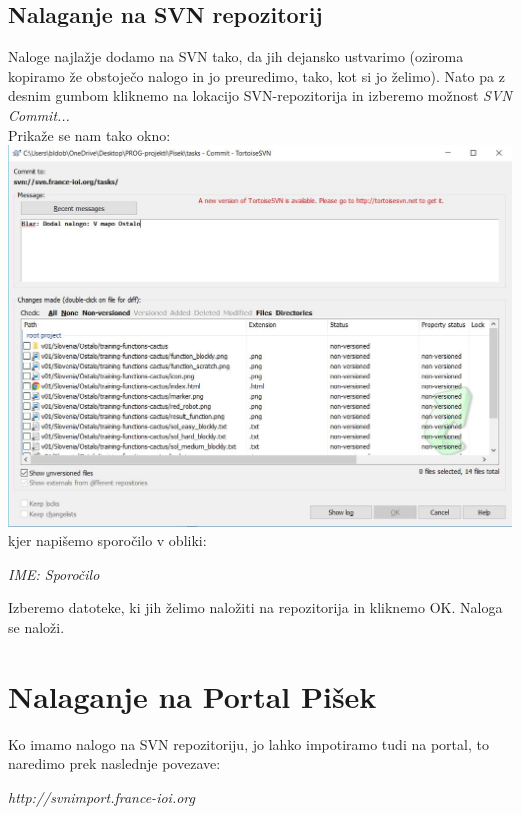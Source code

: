 \documentclass[11pt]{article} %
\begin{document}
\subsection{Nalaganje na SVN repozitorij}
Naloge najlažje dodamo na SVN tako, da jih dejansko ustvarimo (oziroma kopiramo že obstoječo nalogo in jo preuredimo, tako, kot si jo želimo). Nato pa z desnim gumbom kliknemo na lokacijo SVN-repozitorija in izberemo možnost \textit{SVN Commit...}\\
Prikaže se nam tako okno: \\[0.5cm]
\includegraphics[scale=0.5]{svn_nalaganje}\\[0.5cm]
kjer napišemo sporočilo v obliki:\\
\begin{center}
\textit{IME: Sporočilo}
\end{center}
Izberemo datoteke, ki jih želimo naložiti na repozitorija in kliknemo OK. Naloga se naloži.

\pagebreak
\section{Nalaganje na Portal Pišek}

Ko imamo nalogo na SVN repozitoriju, jo lahko impotiramo tudi na portal, to naredimo prek naslednje povezave:\\
\begin{center}
\textit{http://svnimport.france-ioi.org}
\end{center}
\end{document}
